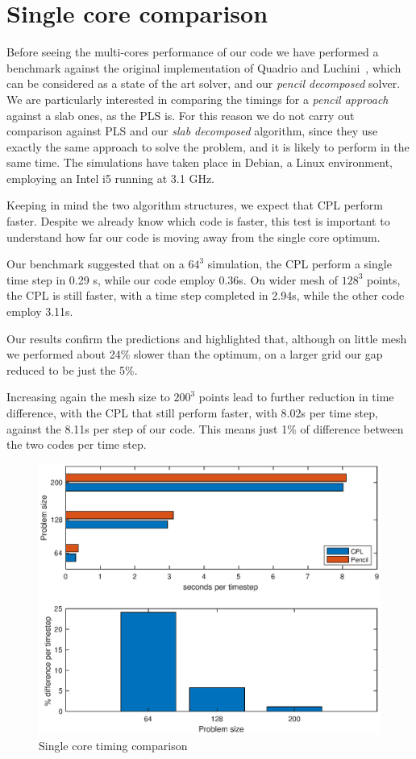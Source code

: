 \section{Single core comparison}
Before seeing the multi-cores performance of our code we have performed a benchmark against the original implementation of Quadrio and Luchini~\cite{cpl:presentazione}, which can be considered as a state of the art solver, and our \emph{pencil decomposed} solver. We are particularly  interested in comparing the timings for a \emph{pencil approach} against a slab ones, as the PLS is. For this reason we do not carry out comparison against PLS and our \emph{slab decomposed} algorithm, since they use exactly the same approach to solve the problem, and it is likely to perform in the same time.
The simulations have taken place in Debian, a Linux environment, employing an Intel i5 running at 3.1 GHz.\par
Keeping in mind the two algorithm structures, we expect that CPL perform faster. Despite we already know which code is faster, this test is important to understand how far our code is moving away from the single core optimum. \par
Our benchmark suggested that on a $64^{3}$ simulation, the CPL perform a single time step in 0.29 s, while our code employ 0.36s.
On wider mesh of $128^{3}$ points, the CPL  is still faster, with a time step completed in 2.94s, while the other code employ 3.11s.\par
Our results confirm the predictions and highlighted that, although on little mesh we performed about 24\% slower than the optimum, on a larger grid our gap reduced to be just the 5\%. \par
Increasing again the mesh size to $200^{3}$ points lead to further reduction in time difference, with the CPL that still perform faster, with 8.02s per time step, against the 8.11s per step of our code. This means just 1\% of difference between the two codes per time step.
\begin{figure}
\begin{center}
\includegraphics[scale=0.55]{grafici/single_core}
\caption{Single core timing comparison}
\label{single:core}
\end{center}
\end{figure}
